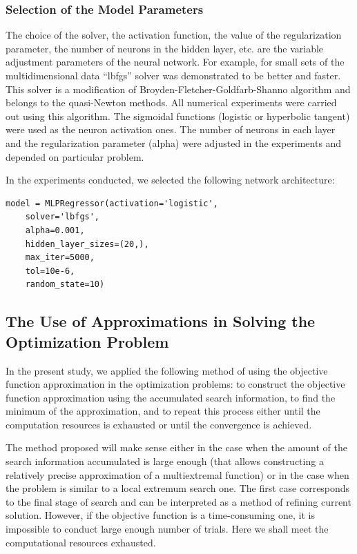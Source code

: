 \documentclass[applsci,article,submit,moreauthors,pdftex]{Definitions/mdpi}
\begin{document}
\subsubsection{Selection of the Model Parameters}

The choice of the solver, the activation function, the value of the regularization parameter, the number of neurons in the hidden layer, etc. are the variable adjustment parameters of the neural network.
For example, for small sets of the multidimensional data ``lbfgs'' solver was demonstrated to be better and faster. This solver is a modification of Broyden-Fletcher-Goldfarb-Shanno algorithm \cite{Nocedal2006} and belongs to the quasi-Newton methods. All numerical experiments were carried out using this algorithm.
The sigmoidal functions (logistic or hyperbolic tangent) were used as the neuron activation ones.
The number of neurons in each layer and the regularization parameter (alpha) were adjusted in the experiments and depended on particular problem.

In the experiments conducted, we selected the following network architecture:
\begin{verbatim}
model = MLPRegressor(activation='logistic',
	solver='lbfgs',
	alpha=0.001,
	hidden_layer_sizes=(20,),
	max_iter=5000,
	tol=10e-6,
	random_state=10)
\end{verbatim}


\subsection{The Use of Approximations in Solving the Optimization Problem}\label{GSA_Appr}

In the present study, we applied the following method of using the objective function approximation in the optimization problems: to construct the objective function approximation using the accumulated search information, to find the minimum of the approximation, and to repeat this process either until the computation resources is exhausted or until the convergence is achieved.

The method proposed will make sense either in the case when the amount of the search information accumulated is large enough (that allows constructing a relatively precise approximation of a multiextremal function) or in the case when the problem is similar to a local extremum search one.
The first case corresponds to the final stage of search and can be interpreted as a method of refining current solution. However, if the objective function is a time-consuming one, it is impossible to conduct large enough number of trials. Here we shall meet the computational resources exhausted.
\end{document}
